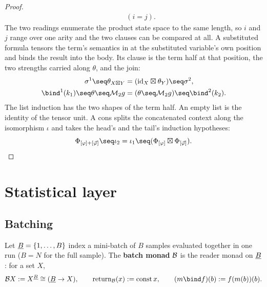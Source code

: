 \begin{proof}
\begin{gather*}
    \qquad (i = j).
\end{gather*}
The two readings enumerate the product state space to the same length, so
$i$ and $j$ range over one arity and the two clauses can be compared at
all. A substituted formula tensors the term's semantics in at the
substituted variable's own position and binds the result into the body. Its
clause is the term half at that position, the two strengths carried along
$\theta$, and the join:
\begin{align*}
  \sigma^1 \seq \theta_{X \boxtimes Y}
  &= (\mathrm{id}_X \boxtimes \theta_Y) \seq \sigma^2, \\
  \bind^1(k_1) \seq \theta \seq \mathcal M_2 g
  &= (\theta \seq \mathcal M_2 g) \seq \bind^2(k_2).
\end{align*}
The list induction has the two shapes of the term half. An empty list is the
identity of the tensor unit. A cons splits the concatenated context along
the isomorphism $\iota$ and takes the head's and the tail's induction
hypotheses:
\[
  \Phi_{[\varphi] + [\vec\varphi]} \seq \iota_2
    = \iota_1 \seq (\Phi_{[\varphi]} \boxtimes \Phi_{[\vec\varphi]}).
\]
\end{proof}



\section{Statistical layer}  %
\label{sec:statistical-layer}

\subsection{Batching}  %
\label{sec:batching}

\begin{definition}
\label{def:batch-monad}
\leanok
Let $\underline B = \{1,\ldots,B\}$ index a mini-batch of $B$ samples
evaluated together in one run ($B=N$ for the full sample). The
\textbf{batch monad} $\mathcal B$ is the reader monad on $\underline B$: for a set
$X$,
\[
  \Bmon X := X^{\Bidx} \cong (\Bidx \to X), \qquad
  \Ret_{\Bmon}(x) := \mathrm{const}\,x, \qquad
  (m \bind f)(b) := f(m(b))(b).
\]
\end{definition}

